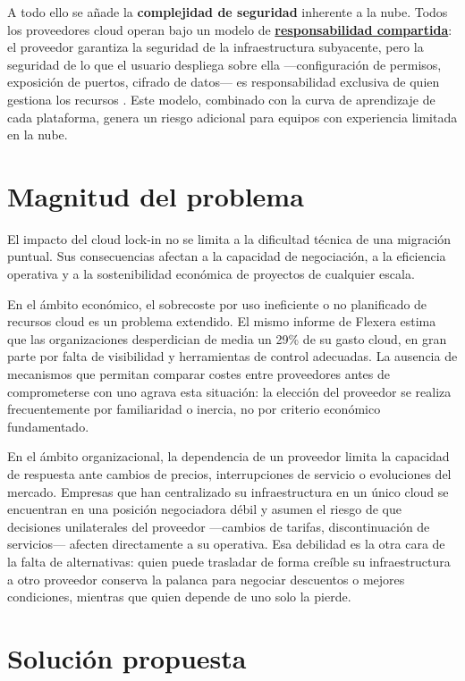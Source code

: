 A todo ello se añade la \textbf{complejidad de seguridad} inherente
a la nube. Todos los proveedores cloud operan bajo un modelo de
\hyperlink{shared-responsibility}{\textbf{responsabilidad compartida}}: el proveedor garantiza la seguridad de la
infraestructura subyacente, pero la seguridad de lo que el usuario despliega sobre
ella —configuración de permisos, exposición de puertos, cifrado de datos— es
responsabilidad exclusiva de quien gestiona los recursos \cite{awsSharedResponsibility}.
Este modelo, combinado con la curva de aprendizaje de cada plataforma, genera un
riesgo adicional para equipos con experiencia limitada en la nube.

\section{Magnitud del problema}

El impacto del cloud lock-in no se limita a la dificultad técnica de una migración
puntual. Sus consecuencias afectan a la capacidad de negociación, a la eficiencia
operativa y a la sostenibilidad económica de proyectos de cualquier escala.

En el ámbito económico, el sobrecoste por uso ineficiente o no planificado de
recursos cloud es un problema extendido. El mismo informe de Flexera
\cite{flexera2026} estima que las organizaciones desperdician de media un 29\%
de su gasto cloud, en gran parte por falta de visibilidad y herramientas de
control adecuadas. La ausencia de mecanismos que permitan comparar costes entre
proveedores antes de comprometerse con uno agrava esta situación: la elección
del proveedor se realiza frecuentemente por familiaridad o inercia, no por
criterio económico fundamentado.

En el ámbito organizacional, la dependencia de un proveedor limita la capacidad
de respuesta ante cambios de precios, interrupciones de servicio o evoluciones
del mercado. Empresas que han centralizado su infraestructura en un único cloud
se encuentran en una posición negociadora débil y asumen el riesgo de que
decisiones unilaterales del proveedor —cambios de tarifas, discontinuación de
servicios— afecten directamente a su operativa. Esa debilidad es la otra cara de la
falta de alternativas: quien puede trasladar de forma creíble su infraestructura a
otro proveedor conserva la palanca para negociar descuentos o mejores condiciones,
mientras que quien depende de uno solo la pierde.

\section{Solución propuesta}

